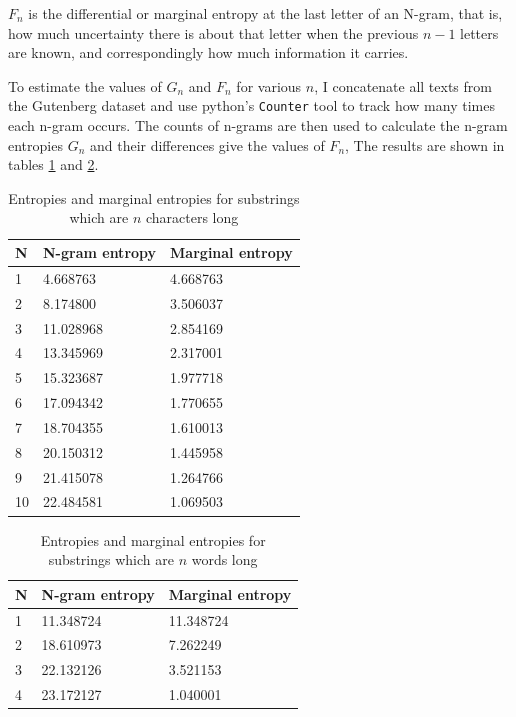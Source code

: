 $F_n$ is the differential or marginal entropy at the last letter of an N-gram, that is, how much uncertainty there is about that letter when the previous $n-1$ letters are known, and correspondingly how much information it carries.

To estimate the values of $G_n$ and $F_n$ for various $n$, I concatenate all texts from the Gutenberg dataset and use python's \texttt{Counter} tool to track how many times each n-gram occurs. The counts of n-grams are then used to calculate the n-gram entropies $G_n$ and their differences give the values of $F_n$, The results are shown in tables \ref{tab:n_gram_entropy} and \ref{tab:n_word_entropy}.


\begin{table}[h]
\centering
\begin{tabular}{ |p{1cm}||p{3cm}|p{3cm}|  }
 \hline
    N  & N-gram entropy & Marginal entropy\\
 \hline
    1  &     4.668763   &    4.668763\\
    2  &     8.174800   &    3.506037\\
    3  &    11.028968   &    2.854169\\
    4  &    13.345969   &    2.317001\\
    5  &    15.323687   &    1.977718\\
    6  &    17.094342   &    1.770655\\
    7  &    18.704355   &    1.610013\\
    8  &    20.150312   &    1.445958\\
    9  &    21.415078   &    1.264766\\
    10 &    22.484581   &    1.069503\\
 \hline
\end{tabular}
\caption{Entropies and marginal entropies for substrings which are $n$ characters long
\label{tab:n_gram_entropy}}
\end{table}



\begin{table}[h]
\centering
\begin{tabular}{ |p{1cm}||p{3cm}|p{3cm}|  }
 \hline
    N  & N-gram entropy & Marginal entropy\\
 \hline
    1  &    11.348724   &     11.348724\\
    2  &    18.610973   &      7.262249\\
    3  &    22.132126   &      3.521153\\
    4  &    23.172127   &      1.040001\\
 \hline
\end{tabular}
\caption{Entropies and marginal entropies for substrings which are $n$ words long
\label{tab:n_word_entropy}}
\end{table}

